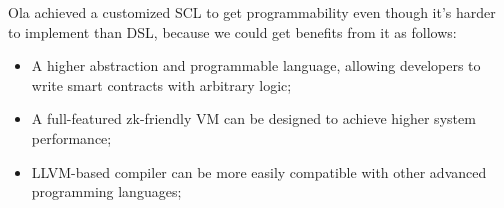 Ola achieved a customized SCL to get programmability even though it's harder to implement than DSL, because we could get benefits from it as follows:
 \begin{itemize}
 \item A higher abstraction and programmable language, allowing developers to write smart contracts with arbitrary logic;
 \item A full-featured zk-friendly VM can be designed to achieve higher system performance;
 \item LLVM-based compiler can be more easily compatible with other advanced programming languages;
\end{itemize}
